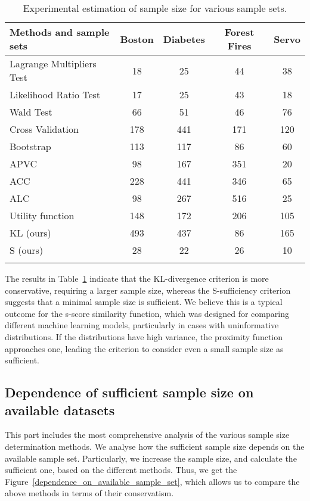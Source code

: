 \documentclass[sn-mathphys-num]{sn-jnl}%
\begin{document}
\begin{table}[ht]
    \centering
    \caption{Experimental estimation of sample size for various sample sets.}\label{table:results}
    \begin{tabular}{lcccc}
    \hline
        \toprule
        Methods and sample sets & Boston & Diabetes & Forest Fires & Servo \\ 
        \midrule
        Lagrange Multipliers Test & 18 & 25 & 44 & 38 \\
        Likelihood Ratio Test & 17 & 25 & 43 & 18 \\
        Wald Test & 66 & 51 & 46 & 76 \\ 
        Cross Validation & 178 & 441 & 171 & 120 \\ 
        Bootstrap & 113 & 117 & 86 & 60 \\ 
        APVC & 98 & 167 & 351 & 20 \\ 
        ACC & 228 & 441 & 346 & 65 \\ 
        ALC & 98 & 267 & 516 & 25 \\ 
        Utility function & 148 & 172 & 206 & 105 \\ 
        \midrule
        KL (ours) & 493 & 437 & 86 & 165 \\ 
        S (ours) & 28 & 22 & 26 & 10 \\
        \botrule
    \end{tabular}
\end{table}

The results in Table~\ref{table:results} indicate that the KL-divergence criterion is more conservative, requiring a larger sample size, whereas the S-sufficiency criterion suggests that a minimal sample size is sufficient. We believe this is a typical outcome for the s-score similarity function, which was designed for comparing different machine learning models, particularly in cases with uninformative distributions. If the distributions have high variance, the proximity function approaches one, leading the criterion to consider even a small sample size as sufficient.

\subsection{Dependence of sufficient sample size on available datasets}

This part includes the most comprehensive analysis of the various sample size determination methods. We analyse how the sufficient sample size depends on the available sample set. Particularly, we increase the sample size, and calculate the sufficient one, based on the different methods. Thus, we get the Figure~\ref{dependence_on_available_sample_set}, which allows us to compare the above methods in terms of their conservatism. 
\end{document}
